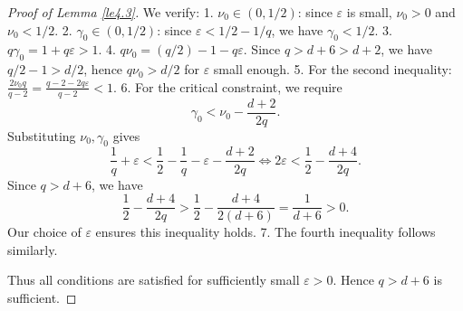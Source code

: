 \documentclass[10pt,a4paper]{amsart}
\begin{document}
\begin{proof}[Proof of Lemma \ref{le4.3}]
We verify:
1. $\nu_0\in(0,1/2)$: since $\varepsilon$ is small, $\nu_0>0$ and $\nu_0<1/2$.
2. $\gamma_0\in(0,1/2)$: since $\varepsilon<1/2-1/q$, we have $\gamma_0<1/2$.
3. $q\gamma_0=1+q\varepsilon>1$.
4. $q\nu_0=(q/2)-1-q\varepsilon$. Since $q>d+6>d+2$, we have $q/2-1>d/2$, hence $q\nu_0>d/2$ for $\varepsilon$ small enough.
5. For the second inequality: $\frac{2\nu_0 q}{q-2}=\frac{q-2-2q\varepsilon}{q-2}<1$.
6. For the critical constraint, we require
$$
\gamma_0 < \nu_0-\frac{d+2}{2q}.
$$
Substituting $\nu_0,\gamma_0$ gives
$$
\frac1q+\varepsilon < \frac12-\frac1q-\varepsilon-\frac{d+2}{2q}
\iff
2\varepsilon < \frac12-\frac{d+4}{2q}.
$$
Since $q>d+6$, we have
$$
\frac12-\frac{d+4}{2q}>\frac12-\frac{d+4}{2(d+6)}=\frac{1}{d+6}>0.
$$
Our choice of $\varepsilon$ ensures this inequality holds.
7. The fourth inequality follows similarly.

Thus all conditions are satisfied for sufficiently small $\varepsilon>0$. Hence $q>d+6$ is sufficient.
\end{proof}
\end{document}
